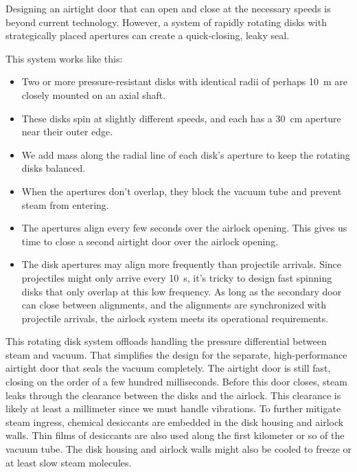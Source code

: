 \documentclass{article}
\begin{document}
Designing an airtight door that can open and close at the necessary speeds is beyond current technology. However, a system of rapidly rotating disks with strategically placed apertures can create a quick-closing, leaky seal.

This system works like this:

\begin{itemize}
\item Two or more pressure-resistant disks with identical radii of perhaps \SI{10}{\meter} are closely mounted on an axial shaft.

\item These disks spin at slightly different speeds, and each has a \SI{30}{\centi\meter} aperture near their outer edge.

\item We add mass along the radial line of each disk's aperture to keep the rotating disks balanced.

\item When the apertures don't overlap, they block the vacuum tube and prevent steam from entering.

\item The apertures align every few seconds over the airlock opening.   This gives us time to close a second airtight door over the airlock opening.

\item The disk apertures may align more frequently than projectile arrivals.  Since projectiles might only arrive every \SI{10}{\second}, it's tricky to design fast spinning disks that only overlap at this low frequency.  As long as the secondary door can close between alignments, and the alignments are synchronized with projectile arrivals, the airlock system meets its operational requirements.
\end{itemize}

This rotating disk system offloads handling the pressure differential between steam and vacuum.  That simplifies the design for the separate, high-performance airtight door that seals the vacuum completely. The airtight door is still fast, closing on the order of a few hundred milliseconds.  Before this door closes, steam leaks through the clearance between the disks and the airlock.  This clearance is likely at least a millimeter since we must handle vibrations.  To further mitigate steam ingress, chemical desiccants are embedded in the disk housing and airlock walls. Thin films of desiccants are also used along the first kilometer or so of the vacuum tube.  The disk housing and airlock walls might also be cooled to freeze or at least slow steam molecules.
\end{document}
